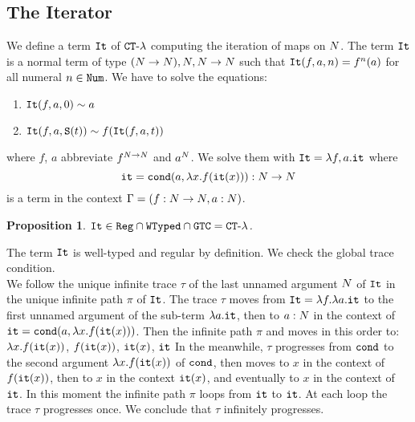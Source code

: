 \documentclass{article}
\newtheorem{proposition}[theorem]{Proposition}
\newenvironment{proof}[1][Proof]{\begin{trivlist}
\item[\hskip \labelsep {\bfseries #1}]}{\end{trivlist}}
\begin{document}


\subsection{The Iterator}

\begin{Eg}
We define a term ${\tt It}$ of  ${ {\tt CT} \mbox{-} \lambda}$ computing the iteration of maps on ${N}$.
The term ${\tt It}$ is a normal term of type $({N} \rightarrow {N}), {N},{N} \rightarrow {N}$ such that
${\tt It}(f,a,n)=f^n(a)$ for all numeral $n \in {\tt Num}$. 
We have to solve the equations:

\begin{enumerate}
\item
${\tt It}(f,a,0) \sim a$ 
\item
${\tt It}(f,a,{\tt S} (t)) \sim f({\tt It}(f,a,t))$
\end{enumerate}

where $f$, $a$ abbreviate $f^{{N}\rightarrow{N}}$ and $a^{N}$.
We solve them with ${\tt It} = \lambda f, a.{\tt it}$
where 
$$
{\tt it} = {\tt cond} (a, \lambda x.f({\tt it}(x))):{N} \rightarrow {N}
$$ 
is a term in the context $\Gamma = (f:{N} \rightarrow {N}, a:{N})$.
\end{Eg}

\begin{proposition}
${\tt It} \in {\tt Reg} \cap {\tt WTyped} \cap {\tt GTC} = { {\tt CT} \mbox{-} \lambda}$.
\end{proposition}

\begin{proof}
The term ${\tt It}$ is well-typed and regular by definition. 
We check the global trace condition. 
\\
We follow the unique infinite trace $\tau$ of the last unnamed argument ${N}$ of ${\tt It}$ 
in the unique infinite path $\pi$ of ${\tt It}$. 
The trace $\tau$ moves from  ${\tt It} = \lambda f. \lambda a.{\tt it}$
 to the first unnamed argument of the sub-term $\lambda a.{\tt it}$, 
then to $a:{N}$ in the context of ${\tt it} = {\tt cond} (a, \lambda x.f({\tt it}(x)))$.
Then the infinite path $\pi$ and moves in this order to:
 $\lambda x.f({\tt it}(x))$, $f({\tt it}(x))$, $ {\tt it}(x)$, ${\tt it}$
In the meanwhile, $\tau$ progresses from ${\tt cond}$ to the second argument $\lambda x.f({\tt it}(x))$
of ${\tt cond}$, then moves to $x$ in the context of $f({\tt it}(x))$,
then to $x$ in the context ${\tt it}(x)$, and eventually to $x$ in the context of ${\tt it}$.
In this moment the infinite path $\pi$ loops from ${\tt it}$ to ${\tt it}$. At each loop the trace $\tau$ 
progresses once. We conclude that $\tau$ infinitely progresses.
\end{proof}
\end{document}
